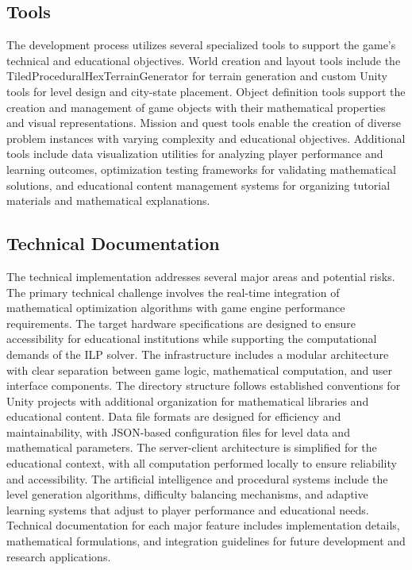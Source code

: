 \documentclass[english]{tudscrreprt}
\begin{document}
\subsection{Tools}
The development process utilizes several specialized tools to support the game's technical and educational objectives. World creation and layout tools include the TiledProceduralHexTerrainGenerator for terrain generation and custom Unity tools for level design and city-state placement. Object definition tools support the creation and management of game objects with their mathematical properties and visual representations. Mission and quest tools enable the creation of diverse problem instances with varying complexity and educational objectives. Additional tools include data visualization utilities for analyzing player performance and learning outcomes, optimization testing frameworks for validating mathematical solutions, and educational content management systems for organizing tutorial materials and mathematical explanations.

\subsection{Technical Documentation}
The technical implementation addresses several major areas and potential risks. The primary technical challenge involves the real-time integration of mathematical optimization algorithms with game engine performance requirements. The target hardware specifications are designed to ensure accessibility for educational institutions while supporting the computational demands of the ILP solver. The infrastructure includes a modular architecture with clear separation between game logic, mathematical computation, and user interface components. The directory structure follows established conventions for Unity projects with additional organization for mathematical libraries and educational content. Data file formats are designed for efficiency and maintainability, with JSON-based configuration files for level data and mathematical parameters. The server-client architecture is simplified for the educational context, with all computation performed locally to ensure reliability and accessibility. The artificial intelligence and procedural systems include the level generation algorithms, difficulty balancing mechanisms, and adaptive learning systems that adjust to player performance and educational needs. Technical documentation for each major feature includes implementation details, mathematical formulations, and integration guidelines for future development and research applications.
\end{document}
